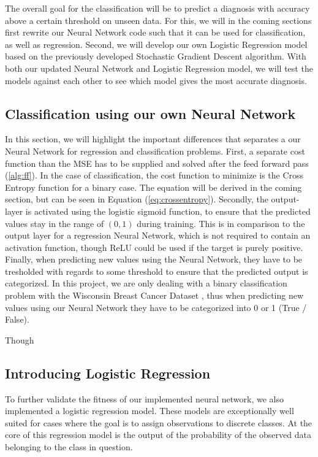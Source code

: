 \documentclass
[twocolumn,
secnumarabic,
nobibnotes,
aps,
prl,
reprint,
groupedaddress,
amsmath,
amssymb
]{revtex4-2}
\begin{document}
The overall goal for the classification will be to predict a diagnosis with accuracy above a certain threshold on unseen data. For this, we will in the coming sections first rewrite our Neural Network code such that it can be used for classification, as well as regression. Second, we will develop our own Logistic Regression model based on the previously developed Stochastic Gradient Descent algorithm. With both our updated Neural Network and Logistic Regression model, we will test the models against each other to see which model gives the most accurate diagnosis.

\subsection{Classification using our own Neural Network}
In this section, we will highlight the important differences that separates a our Neural Network for regression and classification problems. First, a separate cost function than the MSE has to be supplied and solved after the feed forward pass (\ref{alg:ff}). In the case of classification, the cost function to minimize is the Cross Entropy function for a binary case. The equation will be derived in the coming section, but can be  seen in Equation (\ref{eq:crossentropy}). 
Secondly, the output-layer is activated using the logistic sigmoid function, to ensure that the predicted values stay in the range of $(0,1)$ during training. This is in comparison to the output layer for a regression Neural Network, which is not required to contain an activation function, though ReLU could be used if the target is purely positive. Finally, when predicting new values using the Neural Network, they have to be tresholded with regards to some threshold to ensure that the predicted output is categorized. In this project, we are only dealing with a binary classification problem with the Wisconsin Breast Cancer Dataset \cite{scikit-learn}, thus when predicting new values using our Neural Network they have to be categorized into 0 or 1 (True / False).

Though 

\subsection{Introducing Logistic Regression}
To further validate the fitness of our implemented neural network, we also implemented a logistic regression model.  These models are exceptionally well suited for cases where the goal is to assign observations to discrete classes. At the core of this regression model is the output of the probability of  the observed data belonging to the class in question.
\end{document}
